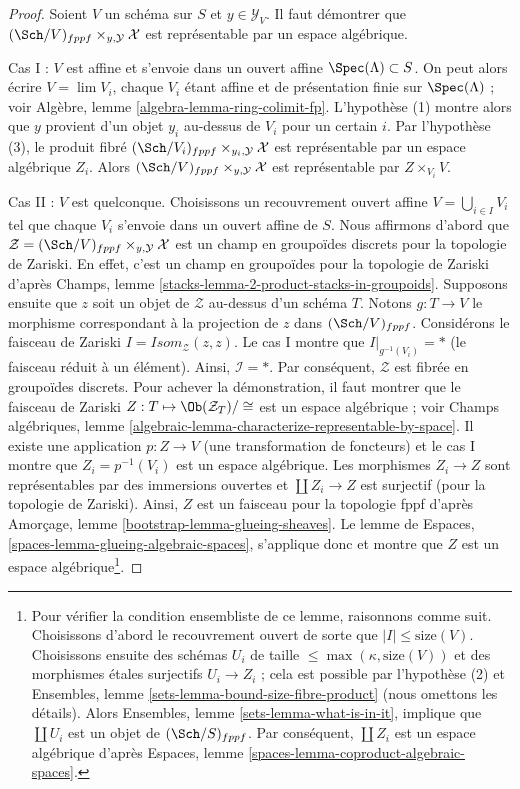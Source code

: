 \begin{proof}
Soient $V$ un schéma sur $S$ et $y \in \mathcal{Y}_V$. Il faut démontrer que
$(\Sch/V)_{fppf} \times_{y, \mathcal{Y}} \mathcal{X}$ est représentable
par un espace algébrique.

\medskip\noindent
Cas I : $V$ est affine et s'envoie dans un ouvert affine $\Spec(\Lambda) \subset S$.
On peut alors écrire $V = \lim V_i$, chaque $V_i$ étant affine et de
présentation finie sur $\Spec(\Lambda)$ ; voir
Algèbre, lemme \ref{algebra-lemma-ring-colimit-fp}.
L'hypothèse (1) montre alors que $y$ provient d'un objet $y_i$ au-dessus de $V_i$ pour un certain $i$.
Par l'hypothèse (3), le produit fibré
$(\Sch/V_i)_{fppf} \times_{y_i, \mathcal{Y}} \mathcal{X}$ est représentable
par un espace algébrique $Z_i$. Alors
$(\Sch/V)_{fppf} \times_{y, \mathcal{Y}} \mathcal{X}$ est représentable
par $Z \times_{V_i} V$.

\medskip\noindent
Cas II : $V$ est quelconque. Choisissons un recouvrement ouvert affine
$V = \bigcup_{i \in I} V_i$ tel que chaque $V_i$ s'envoie dans un ouvert affine
de $S$. Nous affirmons d'abord
que $\mathcal{Z} = (\Sch/V)_{fppf} \times_{y, \mathcal{Y}} \mathcal{X}$
est un champ en groupoïdes discrets pour la topologie de Zariski. En effet, c'est un champ en
groupoïdes pour la topologie de Zariski d'après
Champs, lemme \ref{stacks-lemma-2-product-stacks-in-groupoids}.
Supposons ensuite que $z$ soit un objet de $\mathcal{Z}$ au-dessus d'un schéma $T$.
Notons $g : T \to V$ le morphisme correspondant à la
projection de $z$ dans $(\Sch/V)_{fppf}$. Considérons le faisceau de Zariski
$\mathit{I} = \mathit{Isom}_{\mathcal{Z}}(z, z)$. Le cas I montre que
$\mathit{I}|_{g^{-1}(V_i)} = *$ (le faisceau réduit à un élément). Ainsi,
$\mathcal{I} = *$. Par conséquent, $\mathcal{Z}$ est fibrée en groupoïdes discrets. Pour achever
la démonstration, il faut montrer que le faisceau de Zariski
$Z : T \mapsto \Ob(\mathcal{Z}_T)/\cong$ est un espace algébrique ; voir
Champs algébriques, lemme
\ref{algebraic-lemma-characterize-representable-by-space}.
Il existe une application $p : Z \to V$ (une transformation de foncteurs) et le cas I
montre que $Z_i = p^{-1}(V_i)$ est un espace algébrique. Les morphismes
$Z_i \to Z$ sont représentables par des immersions ouvertes et
$\coprod Z_i \to Z$ est surjectif (pour la topologie de Zariski).
Ainsi, $Z$ est un faisceau pour la topologie fppf d'après
Amorçage, lemme \ref{bootstrap-lemma-glueing-sheaves}.
Le lemme de Espaces, \ref{spaces-lemma-glueing-algebraic-spaces},
s'applique donc et montre que $Z$ est un espace algébrique\footnote{
Pour vérifier la condition ensembliste de ce lemme,
raisonnons comme suit. Choisissons d'abord le recouvrement ouvert de sorte que
$|I| \leq \text{size}(V)$. Choisissons ensuite des schémas $U_i$ de taille
$\leq \max(\kappa, \text{size}(V))$ et des morphismes étales surjectifs
$U_i \to Z_i$ ; cela est possible par l'hypothèse (2) et
Ensembles, lemme \ref{sets-lemma-bound-size-fibre-product}
(nous omettons les détails). Alors
Ensembles, lemme \ref{sets-lemma-what-is-in-it},
implique que $\coprod U_i$ est un objet de $(\Sch/S)_{fppf}$.
Par conséquent, $\coprod Z_i$ est un espace algébrique d'après
Espaces, lemme \ref{spaces-lemma-coproduct-algebraic-spaces}.
}.
\end{proof}

